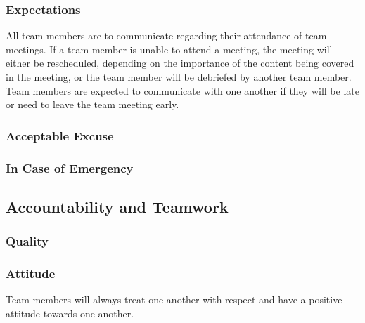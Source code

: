 \documentclass{article}
\begin{document}
\subsubsection*{Expectations}

All team members are to communicate regarding their attendance of team meetings.
If a team member is unable to attend a meeting, the meeting will either be rescheduled, depending on the importance of the content being covered in the meeting, or the team member will be debriefed by another team member. 
Team members are expected to communicate with one another if they will be late or need to leave the team meeting early. 



\subsubsection*{Acceptable Excuse}


\subsubsection*{In Case of Emergency}


\subsection*{Accountability and Teamwork}

\subsubsection*{Quality} 


\subsubsection*{Attitude}

Team members will always treat one another with respect and have a positive attitude towards one another. 
\end{document}
